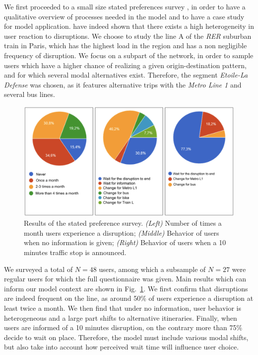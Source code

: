 \documentclass[3p,times,procedia]{elsarticle}
\begin{document}
We first proceeded to a small size stated preferences survey %
, in order to have a qualitative overview of processes needed in the model and to have a case study for model application. \cite{martin2016strategies} have indeed shown that there exists a high heterogeneity in user reaction to disruptions. We choose to study the line A of the \emph{RER} suburban train in Paris, which has the highest load in the region and has a non negligible frequency of disruption. We focus on a subpart of the network, in order to sample users which have a higher chance of realizing a given origin-destination pattern, and for which several modal alternatives exist. Therefore, the segment \emph{Etoile-La Defense} was chosen, as it features alternative trips with the \emph{Metro Line 1} and several bus lines.


\begin{figure}[t]\vspace*{4pt}
\centerline{\includegraphics[width=\linewidth]{figures/Fig1.png}}
\caption{Results of the stated preference survey. \textit{(Left)} Number of times a month users experience a disruption; \textit{(Middle)} Behavior of users when no information is given; \textit{(Right)} Behavior of users when a 10 minutes traffic stop is announced.\label{fig:fig1}}
\end{figure}

We surveyed a total of $N=48$ users, among which a subsample of $N=27$ were regular users for which the full questionnaire was given. Main results which can inform our model context are shown in Fig.~\ref{fig:fig1}. We first confirm that disruptions are indeed frequent on the line, as around 50\% of users experience a disruption at least twice a month. We then find that under no information, user behavior is heterogeneous and a large part shifts to alternative itineraries. Finally, when users are informed of a 10 minutes disruption, on the contrary more than 75\% decide to wait on place. Therefore, the model must include various modal shifts, but also take into account how perceived wait time will influence user choice.
\end{document}
